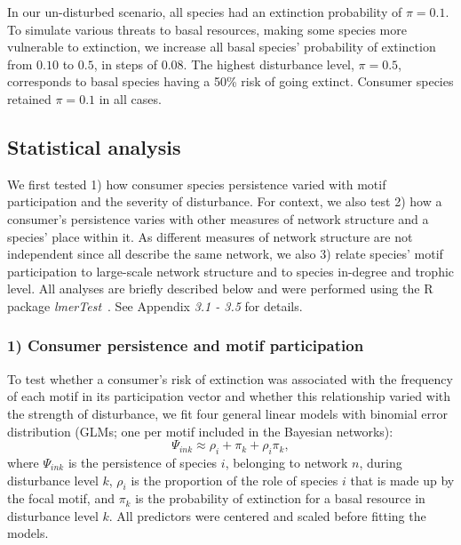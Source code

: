 \documentclass[12pt]{article}
\begin{document}
\begin{spacing}{2.0}
            In our un-disturbed scenario, all species had an extinction probability of $\pi = 0.1$. 
            To simulate various threats to basal resources, making some species more vulnerable to extinction, we increase all basal species' probability of extinction from $0.10$ to $0.5$, in steps of $0.08$. 
            The highest disturbance level, $\pi = 0.5$, corresponds to basal species having a 50\% risk of going extinct. 
            Consumer species retained $\pi=0.1$ in all cases.


	\subsection*{Statistical analysis} 

        We first tested 1) how consumer species persistence varied with motif participation and the severity of disturbance.
        For context, we also test 2) how a consumer's persistence varies with other measures of network structure and a species' place within it.
        As different measures of network structure are not independent since all describe the same network, we also 3) relate species' motif participation to large-scale network structure and to species in-degree and trophic level.
        All analyses are briefly described below and were performed using the R~\citep{R} package \emph{lmerTest}~\citep{lmerTest}.
        See Appendix \emph{3.1 - 3.5} for details. 

        
        \subsubsection*{1) Consumer persistence and motif participation}

            To test whether a consumer's risk of extinction was associated with the frequency of each motif in its participation vector and whether this relationship varied with the strength of disturbance, we fit four general linear models with binomial error distribution (GLMs; one per motif included in the Bayesian networks):
            \begin{equation}
            \Psi_{ink} \approx \rho_{i} + \pi_{k} + \rho_{i}\pi_{k} ,
            \label{propreq}
            \end{equation}
            \noindent where $\Psi_{ink}$ is the persistence of species $i$, belonging to network $n$, during disturbance level $k$, $\rho_{i}$ is the proportion of the role of species $i$ that is made up by the focal motif, and $\pi_k$ is the probability of extinction for a basal resource in disturbance level $k$.
            All predictors were centered and scaled before fitting the models.         
            

\end{spacing}
\end{document}
